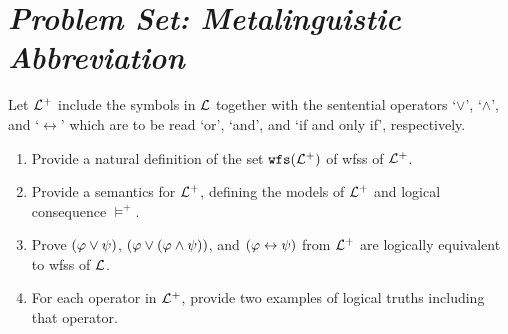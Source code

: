 \documentclass[a4paper, 11pt]{article} %
\begin{document}
\section*{\it Problem Set: Metalinguistic Abbreviation}

Let $\mathcal{L}^+$ include the symbols in $\mathcal{L}$ together with the sentential operators `$\vee$', `$\wedge$', and `$\leftrightarrow$' which are to be read `or', `and', and `if and only if', respectively.
\begin{enumerate}[leftmargin=.32in,labelsep=.15in,label=(\arabic*)]\small
  \item Provide a natural definition of the set $\texttt{wfs}(\mathcal{L}^+)$ of wfss of $\mathcal{L}^+$.
  \item Provide a semantics for $\mathcal{L}^+$, defining the models of $\mathcal{L}^+$ and logical consequence $\vDash^+$.
  \item Prove $(\varphi \vee \psi)$, $(\varphi \vee (\varphi \wedge \psi))$, and $(\varphi\leftrightarrow \psi)$ from $\mathcal{L}^+$ are logically equivalent to wfss of $\mathcal{L}$.
  \item For each operator in $\mathcal{L}^+$, provide two examples of logical truths including that operator.
\end{enumerate}

\end{document}
